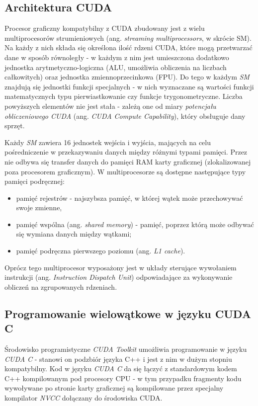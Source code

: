 \documentclass[12pt]{article}
\begin{document}
\subsection{Architektura CUDA}

Procesor graficzny kompatybilny z CUDA zbudowany jest z wielu multiprocesorów strumieniowych (ang. \textit{streaming multiprocessors}, w skrócie SM). Na każdy z nich składa się określona ilość rdzeni CUDA, które mogą przetwarzać dane w sposób równoległy - w każdym z nim jest umieszczona dodatkowo jednostka arytmetyczno-logiczna (ALU, umożliwia obliczenia na liczbach całkowitych) oraz jednostka zmiennoprzecinkowa (FPU). Do tego w każdym \textit{SM} znajdują się jednostki funkcji specjalnych - w nich wyznaczane są wartości funkcji matematycznych typu pierwiastkowanie czy funkcje trygonometryczne. Liczba powyższych elementów nie jest stała - zależą one od miary \textit{potencjału obliczeniowego CUDA} (ang. \textit{CUDA Compute Capability}), który obsługuje dany sprzęt.

Każdy \textit{SM} zawiera 16 jednostek wejścia i wyjścia, mających na celu pośredniczenie w przekazywaniu danych między różnymi typami pamięci. Przez nie odbywa się transfer danych do pamięci RAM karty graficznej (zlokalizowanej poza procesorem graficznym). W multiprocesorze są dostępne następujące typy pamięci podręcznej:

\begin{itemize}
\item pamięć rejestrów - najszybsza pamięć, w której wątek może przechowywać swoje zmienne,
\item pamięć wspólna (ang. \textit{shared memory}) - pamięć, poprzez którą może odbywać się wymiana danych między wątkami;
\item pamięć podręczna pierwszego poziomu (ang. \textit{L1 cache}).
\end{itemize}

Oprócz tego multiprocesor wyposażony jest w układy sterujące wywołaniem instrukcji (ang. \textit{Instruction Dispatch Unit}) odpowiadające za wykonywanie obliczeń na zgrupowanych rdzeniach.

\subsection{Programowanie wielowątkowe w języku CUDA C}

Środowisko programistyczne \textit{CUDA Toolkit} umożliwia programowanie w języku \textit{CUDA C} - stanowi on podzbiór języka C++ i jest z nim w dużym stopniu kompatybilny. Kod w języku \textit{CUDA C} da się łączyć z standardowym kodem C++ kompilowanym pod procesory CPU - w tym przypadku fragmenty kodu wywoływane po stronie karty graficznej są kompilowane przez specjalny kompilator \textit{NVCC} dołączany do środowiska CUDA. 
\end{document}
